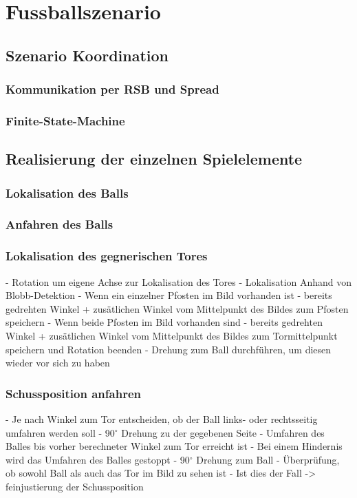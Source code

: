 \chapter{Fussballszenario} \label{kap:Fussballszenario} %

\section{Szenario Koordination} %

\subsection{Kommunikation per RSB und Spread} %

\subsection{Finite-State-Machine} %

\section{Realisierung der einzelnen Spielelemente} %

\subsection{Lokalisation des Balls} %

\subsection{Anfahren des Balls} %

\subsection{Lokalisation des gegnerischen Tores} %
- Rotation um eigene Achse zur Lokalisation des Tores
- Lokalisation Anhand von Blobb-Detektion 
- Wenn ein einzelner Pfosten im Bild vorhanden ist - bereits gedrehten Winkel + zusätlichen Winkel vom Mittelpunkt des Bildes zum Pfosten speichern
- Wenn beide Pfosten im Bild vorhanden sind - bereits gedrehten Winkel + zusätlichen Winkel vom Mittelpunkt des Bildes zum Tormittelpunkt speichern und Rotation beenden
- Drehung zum Ball durchführen, um diesen wieder vor sich zu haben

\subsection{Schussposition anfahren} %
- Je nach Winkel zum Tor entscheiden, ob der Ball links- oder rechtsseitig umfahren werden soll
- 90$^\circ$ Drehung zu der gegebenen Seite 
- Umfahren des Balles bis vorher berechneter Winkel zum Tor erreicht ist
	- Bei einem Hindernis wird das Umfahren des Balles gestoppt
- 90$^\circ$ Drehung zum Ball
- Überprüfung, ob sowohl Ball als auch das Tor im Bild zu sehen ist 
	- Ist dies der Fall -> feinjustierung der Schussposition 

